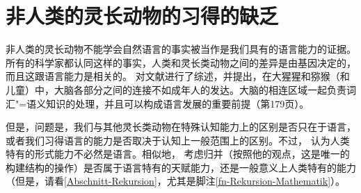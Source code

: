 \section{非人类的灵长动物的习得的缺乏}

非人类的灵长动物不能学会自然语言的事实被当作是我们具有的语言能力的证据。所有的科学家都认同这样的事实，人类和灵长类动物之间的差异是由基因决定的，而且这跟语言能力是相关的。
 \citet{Friederici2009a}对文献进行了综述，并提出，在大猩猩和猕猴（和儿童）中，大脑各部分之间的连接不如成年人的发达。大脑的相连区域一起负责词汇"=语义知识的处理，并且可以构成语言发展的重要前提（第179页）。

但是，问题是，我们与其他灵长类动物在特殊认知能力上的区别是否只在于语言，或者我们习得语言的能力是否取决于认知上一般范围上的区别。不过， \citet[\S~2]{Fanselow92b}认为人类特有的形式能力不必然是语言。相似地， \citet[--8]{Chomsky2007a}考虑归并（按照他的观点，这是唯一的构建结构的操作）是否属于语言特有的天赋能力，还是一般意义上人类特有的能力（但是，请看\ref{Abschnitt-Rekursion}，尤其是脚注\ref{fn-Rekursion-Mathematik}）。

